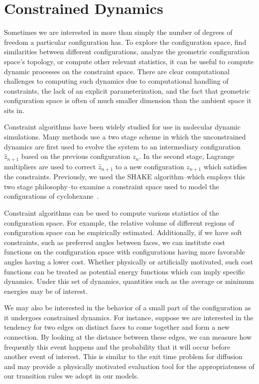 \section{Constrained Dynamics}

Sometimes we are interested in more than simply the number of degrees of freedom a particular configuration has. To explore the configuration space, find similarities between different configurations, analyze the geometric configuration space's topology, or compute other relevant statistics, it can be useful to compute dynamic processes on the constraint space. There are clear computational challenges to computing such dynamics due to computational handling of constraints, the lack of an explicit parameterization, and the fact that geometric configuration space is often of much smaller dimension than the ambient space it sits in.

Constraint algorithms have been widely studied for use in molecular dynamic simulations. Many  methods use a two stage scheme in which the unconstrained dynamics are first used to evolve the system to an intermediary configuration $\hat{z}_{n+1}$ based on the previous configuration $z_n$. In the second stage, Lagrange multipliers are used to correct $\hat{z}_{n+1}$ to a new configuration $z_{n+1}$ which satisfies the constraints. Previously, we used the SHAKE algorithm--which employs this two stage philosophy--to examine a constraint space used to model the configurations of cyclohexane~\cite{Pandey2014}. 

Constraint algorithms can be used to compute various statistics of the configuration space. For example, the relative volume of different regions of configuration space can be empirically estimated. Additionally, if we have soft constraints, such as preferred angles between faces, we can institute cost functions on the configuration space with configurations having more favorable angles having a lower cost. Whether physically or artificially motivated, such cost functions can be treated as potential energy functions which can imply specific dynamics. Under this set of dynamics, quantities such as the average or minimum energies may be of interest. 

We may also be interested in the behavior of a small part of the configuration as it undergoes constrained dynamics. For instance, suppose we are interested in the tendency for two edges on distinct faces to come together and form a new connection. By looking at the distance between these edges, we can measure how frequently this event happens and the probability that it will occur before another event of interest. This is similar to the exit time problem for diffusion and may provide a physically motivated evaluation tool for the appropriateness of our transition rules we adopt in our models. 


